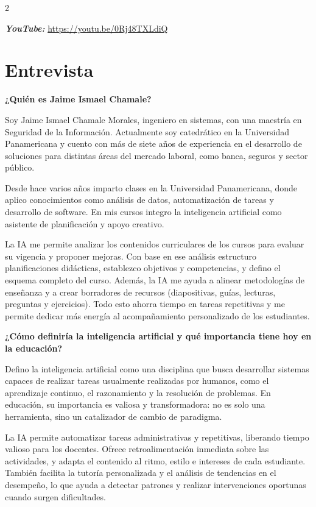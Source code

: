 \documentclass[12pt,spanish,Letterpaper,openany]{book}
\begin{document}
\begin {multicols}{2}

\textbf{\emph{YouTube:}} \url{https://youtu.be/0Rj48TXLdiQ}

\section{Entrevista}\label{entrevista}

\textbf{¿Quién es Jaime Ismael Chamale?}

Soy Jaime Ismael Chamale Morales, ingeniero en sistemas, con una maestría en Seguridad de la Información. Actualmente soy catedrático en la Universidad Panamericana y cuento con más de siete años de experiencia en el desarrollo de soluciones para distintas áreas del mercado laboral, como banca, seguros y sector público.

Desde hace varios años imparto clases en la Universidad Panamericana, donde aplico conocimientos como análisis de datos, automatización de tareas y desarrollo de software. En mis cursos integro la inteligencia artificial como asistente de planificación y apoyo creativo.

La IA me permite analizar los contenidos curriculares de los cursos para evaluar su vigencia y proponer mejoras. Con base en ese análisis estructuro planificaciones didácticas, establezco objetivos y competencias, y defino el esquema completo del curso. Además, la IA me ayuda a alinear metodologías de enseñanza y a crear borradores de recursos (diapositivas, guías, lecturas, preguntas y ejercicios). Todo esto ahorra tiempo en tareas repetitivas y me permite dedicar más energía al acompañamiento personalizado de los estudiantes.

\textbf{¿Cómo definiría la inteligencia artificial y qué importancia tiene hoy en la educación?}

Defino la inteligencia artificial como una disciplina que busca desarrollar sistemas capaces de realizar tareas usualmente realizadas por humanos, como el aprendizaje continuo, el razonamiento y la resolución de problemas. En educación, su importancia es valiosa y transformadora: no es solo una herramienta, sino un catalizador de cambio de paradigma.

La IA permite automatizar tareas administrativas y repetitivas, liberando tiempo valioso para los docentes. Ofrece retroalimentación inmediata sobre las actividades, y adapta el contenido al ritmo, estilo e intereses de cada estudiante. También facilita la tutoría personalizada y el análisis de tendencias en el desempeño, lo que ayuda a detectar patrones y realizar intervenciones oportunas cuando surgen dificultades.


\end{multicols}
\end{document}
